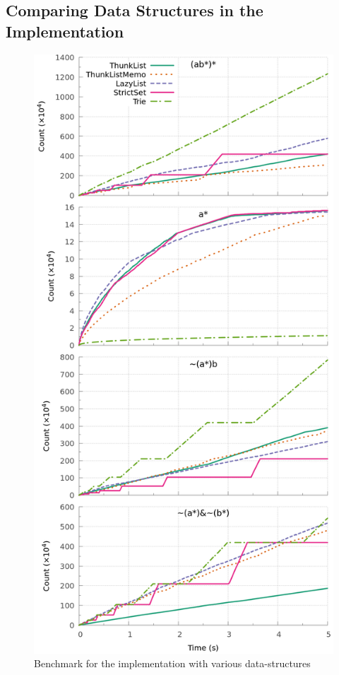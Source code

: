 \subsection{Comparing Data Structures in the \ocaml Implementation}
\label{sec:bench:ocaml}
\begin{figure}[!tb]
  \centering
  \includegraphics[width=\linewidth]{measure/ocaml_all.png}
  \caption{Benchmark for the \ocaml implementation with various data-structures}
  \label{bench:ocaml:all}
  \label{bench:ocaml:union}
\end{figure}

